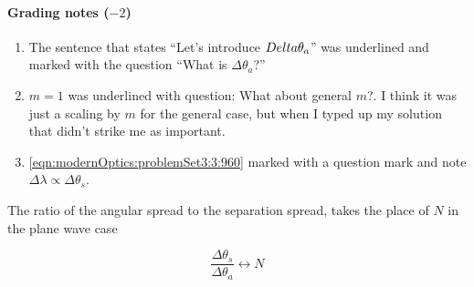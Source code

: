 {\paragraph{Grading notes ($-2$)}
\begin{enumerate}
\item The sentence that states ``Let's introduce $\\Delta \theta_a$'' was underlined and marked with the question ``What is $\Delta \theta_a$?''
\item $m = 1$ was underlined with question: What about general $m$?.  I think it was just a scaling by $m$ for the general case, but when I typed up my solution that didn't strike me as important.
\item \ref{eqn:modernOptics:problemSet3:3:960} marked with a question mark and note $\Delta \lambda \propto \Delta \theta_s$.
\end{enumerate}

The ratio of the angular spread to the separation spread, takes the place of $N$ in the plane wave case

\begin{dmath}\label{eqn:modernOptics:problemSet3:3:980}
\frac{\Delta \theta_s }{\Delta \theta_a} \leftrightarrow N
\end{dmath}


%
%

}
